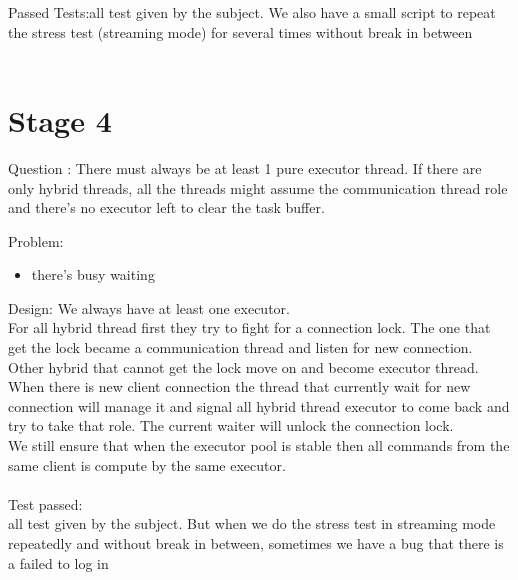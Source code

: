 \documentclass{article}
\begin{document}
Passed Tests:all test given by the subject. We also have a small script to repeat the stress test (streaming mode) for several times without break in between \\\\

\section{Stage 4}
Question : There must always be at least 1 pure executor thread. If there are only hybrid threads, all the threads might assume the communication thread role and there's no executor left to clear the task buffer.

Problem:
\begin{itemize}
\item there's busy waiting
\end{itemize}

Design:
We always have at least one executor.\\
For all hybrid thread first they try to fight for a connection lock. The one that get the lock became a communication thread and listen for new connection. Other hybrid that cannot get the lock move on and become executor thread. When there is new client connection the thread that currently wait for new connection will manage it and signal all hybrid thread executor to come back and try to take that role.
The current waiter will unlock the connection lock.\\
We still ensure that when the executor pool is stable then all commands from the same client is compute by the same executor.
\\\\
Test passed:\\
all test given by the subject. But when we do the stress test in streaming mode repeatedly and without break in between, sometimes we have a bug that there is a failed to log in\\\\
\end{document}
